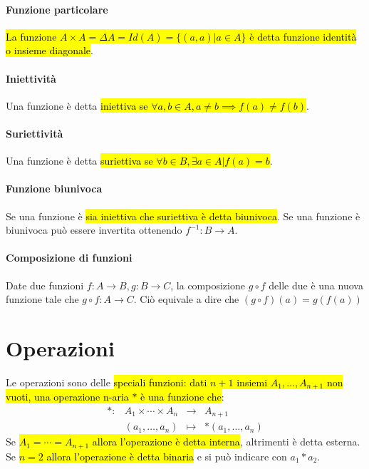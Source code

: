 \documentclass[a4paper,12pt,oneside]{article}
\begin{document}
\paragraph{Funzione particolare} \hl{La funzione
$A \times A = \Delta A = Id(A) = \{(a,a) | a \in A\}$ è detta funzione identità
o insieme diagonale}.

\paragraph{Iniettività} Una funzione è detta \hl{iniettiva se
$\forall a,b \in A, a \neq b \implies f(a) \neq f(b)$}.

\paragraph{Suriettività} Una funzione è detta \hl{suriettiva se
$\forall b \in B, \exists a \in A | f(a) = b$}.

\paragraph{Funzione biunivoca} Se una funzione è \hl{sia iniettiva che
suriettiva è detta biunivoca}. Se una funzione è biunivoca può essere invertita
ottenendo $f^{-1}: B \to A$.

\paragraph{Composizione di funzioni} Date due funzioni $f: A \to B, g: B \to C$,
la composizione $g \circ f$ delle due è una nuova funzione tale che
$g \circ f: A \to C$. Ciò equivale a dire che $(g \circ f)(a) = g(f(a))$

\section{Operazioni}
Le operazioni sono delle \hl{speciali funzioni: dati $n+1$ insiemi
$A_1, \dots, A_{n+1}$ non vuoti, una operazione n-aria $\ast$ è una funzione
che}:\[
    \begin{array}{cccc}
        \ast: &A_1 \times \cdots \times A_{n} &\to &A_{n+1} \\
        &(a_1, \dots, a_n) &\mapsto & \ast (a_1, \dots, a_n)
    \end{array}
\]
Se \hl{$A_1 = \cdots = A_{n+1}$ allora l'operazione è detta interna}, altrimenti
è detta esterna. Se \hl{$n = 2$ allora l'operazione è detta binaria} e si può
indicare con $a_1 \ast a_2$.
\end{document}
